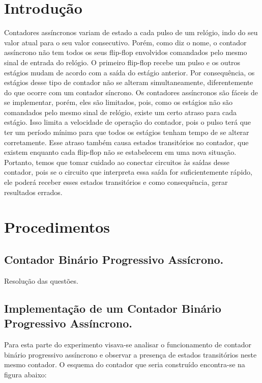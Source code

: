 \documentclass[12pt]{article}
\begin{document}
	\section{Introdução}
	\label{sec:Introducao}
	Contadores assíncronos variam de estado a cada pulso de um relógio, indo do seu valor atual para o seu valor consecutivo. Porém, como diz o nome, o contador assíncrono não tem todos os seus flip-flop envolvidos comandados pelo mesmo sinal de entrada do relógio. O primeiro flip-flop recebe um pulso e os outros estágios mudam de acordo com a saída do estágio anterior.  Por consequência, os estágios desse tipo de contador não se alteram simultaneamente, diferentemente do que ocorre com um contador síncrono. 
	Os contadores assíncronos são fáceis de se implementar, porém, eles são limitados, pois, como os estágios não são comandados pelo mesmo sinal de relógio, existe um certo atraso para cada estágio. Isso limita a velocidade de operação do contador, pois o pulso terá que ter um período mínimo para que todos os estágios tenham tempo de se alterar corretamente. 
	Esse atraso também causa estados transitórios no contador, que existem enquanto cada flip-flop não se estabelecem em uma nova situação. Portanto, temos que tomar cuidado ao conectar circuitos às saídas desse contador, pois se o circuito que interpreta essa saída for suficientemente rápido, ele poderá receber esses estados transitórios e como consequência, gerar resultados errados.  


	\section{Procedimentos}
	\label{sec:Procedimentos}
	

	
	\subsection{Contador Binário Progressivo Assícrono.}
	\label{2.1}
		Resolução das questões.
	
	\subsection{Implementação de um Contador Binário Progressivo Assíncrono.}
	\label{2.2}
	
	Para esta parte do experimento visava-se analisar o funcionamento de contador binário progressivo assíncrono e observar a presença de estados transitórios neste mesmo contador. O esquema do contador que seria construído encontra-se na figura abaixo:
	
\end{document}

